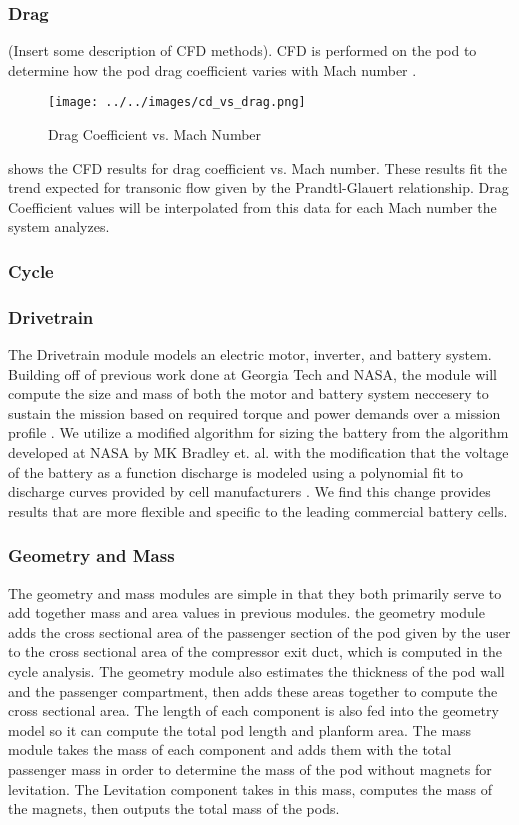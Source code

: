 \subsubsection{Drag}
	(Insert some description of CFD methods).
	CFD is performed on the pod to determine how the pod drag coefficient varies with Mach number .
	\begin{figure}
		\centering
		\texttt{[image: ../../images/cd\_vs\_drag.png]}
		\caption{Drag Coefficient vs. Mach Number}
		\label{fig:cd_vs_mach}
	\end{figure}
	 shows the CFD results for drag coefficient vs. Mach number. These results fit the trend expected for transonic flow given by the Prandtl-Glauert relationship. Drag Coefficient values will be interpolated from this data for each Mach number the system analyzes.
\subsubsection{Cycle}
\subsubsection{Drivetrain}
	The Drivetrain module  models an electric motor, inverter, and battery system. Building off of previous work done at Georgia Tech and NASA, the module will compute the size and mass of both the motor and battery system neccesery to sustain the mission based on required torque and power demands over a mission profile \cite{GeorgiaTechMotor, NASASugar}. We utilize a modified algorithm for sizing the battery from the algorithm developed at NASA by MK Bradley et. al. with the modification that the voltage of the battery as a function discharge is modeled using a polynomial fit to discharge curves provided by cell manufacturers \cite{NASASugar}. We find this change provides results that are more flexible and specific to the leading commercial battery cells.
\subsubsection{Geometry and Mass}
	The geometry and mass modules are simple in that they both primarily serve to add together mass and area values in previous modules. the geometry module adds the cross sectional area of the passenger section of the pod given by the user to the cross sectional area of the compressor exit duct, which is computed in the cycle analysis. The geometry module also estimates the thickness of the pod wall and the passenger compartment, then adds these areas together to compute the cross sectional area. The length of each component is also fed into the geometry model so it can compute the total pod length and planform area. The mass module takes the mass of each component and adds them with the total passenger mass in order to determine the mass of the pod without magnets for levitation. The Levitation component takes in this mass, computes the mass of the magnets, then outputs the total mass of the pods.

